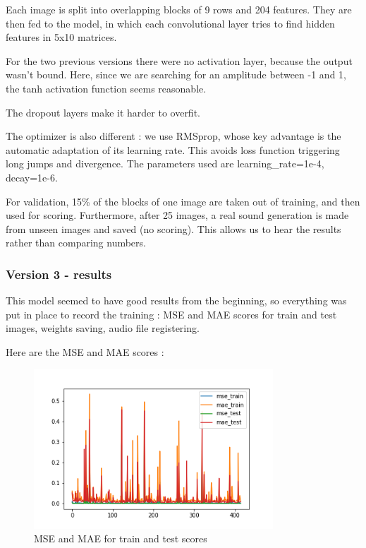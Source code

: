 \documentclass[12pt, twoside]{article}
\begin{document}
Each image is split into overlapping blocks of 9 rows and 204 features. They are then fed to the model, in which each convolutional layer tries to find hidden features in 5x10 matrices. 

For the two previous versions there were no activation layer, because the output wasn't bound. Here, since we are searching for an amplitude between -1 and 1, the tanh activation function seems reasonable.

The dropout layers make it harder to overfit.

The optimizer is also different : we use RMSprop, whose key advantage is the automatic adaptation of its learning rate. This avoids loss function triggering long jumps and divergence. The parameters used are learning_rate=1e-4, decay=1e-6.

For validation, 15\% of the blocks of one image are taken out of training, and then used for scoring. Furthermore, after 25 images, a real sound generation is made from unseen images and saved (no scoring). This allows us to hear the results rather than comparing numbers.

\subsubsection{Version 3 - results}
This model seemed to have good results from the beginning, so everything was put in place to record the training : MSE and MAE scores for train and test images, weights saving, audio file registering.

Here are the MSE and MAE scores :

\begin{figure}[H]
	\centering
	\includegraphics[width=0.8\textwidth]{../images/res_plot_v4.png}
	\caption{MSE and MAE for train and test scores}
	\label{scoresv3}
\end{figure}
\end{document}
